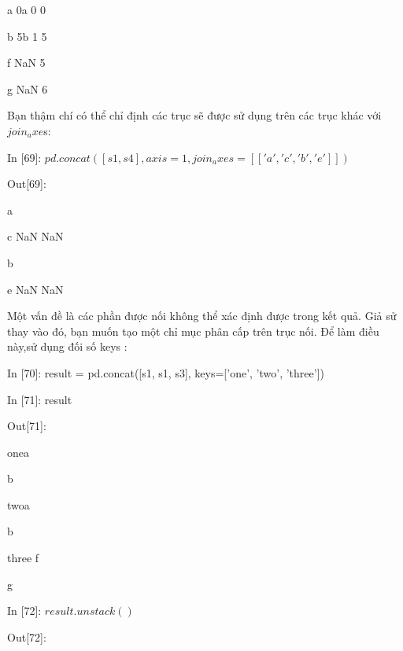     \par\quad\textup a 0\quad\quad\quad\quad\quad\quad\quad\quad\quad\quad\quad\quad\quad\quad a 0 0
\par\quad\textup b 5\quad\quad\quad\quad\quad\quad\quad\quad\quad\quad\quad\quad\quad\quad b 1 5
\par\quad\textup f NaN 5
\par\quad\textup g NaN 6
\par Bạn thậm chí có thể chỉ định các trục sẽ được sử dụng trên các trục khác với$ join_axe$s:
\par\quad\textup In [69]: $pd.concat([s1, s4], axis=1, join_axes=[['a', 'c', 'b', 'e']])$
\par\quad\textup Out[69]:
 \par\quad\quad\xspace\xspace 0\quad\xspace\xspace 1
\par\quad\textup a\quad\xspace\xspace 0
\par\quad\textup c NaN NaN
\par\quad\textup b\quad\xspace\xspace 5
\par\quad\textup e NaN NaN
    \par Một vấn đề là các phần được nối không thể xác định được trong kết quả. Giả sử thay vào đó, bạn muốn tạo một chỉ mục phân cấp trên trục nối. Để làm điều này,sử dụng đối số keys :
\par\quad\textup In [70]: result = pd.concat([s1, s1, s3], keys=['one', 'two', 'three'])
\par\quad\textup In [71]: result
\par\quad\textup Out[71]:
\par\quad\textup one\quad a
\par\quad\textup\quad\quad\xspace b
\par\quad\textup two\quad a
\par\quad\textup\quad\quad\xspace b
\par\quad\textup three f
\par\quad\textup\quad\quad  g
\par\quad\textup In [72]: $result.unstack()$
\par\par\par
\par\quad\textup Out[72]:



